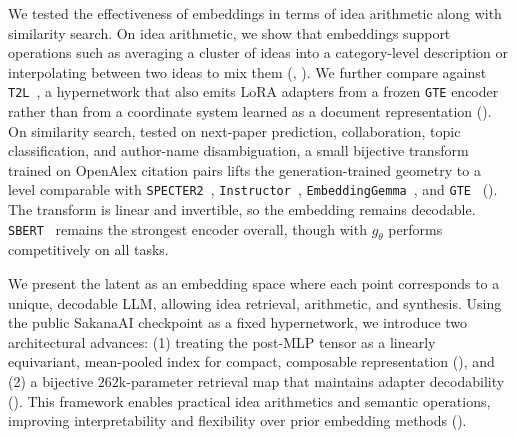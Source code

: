 We tested the effectiveness of \doctolora embeddings in terms of idea arithmetic along with similarity search.
On idea arithmetic, we show that \doctolora embeddings support operations such as averaging a cluster of ideas into a category-level description or interpolating between two ideas to mix them (, ).
We further compare against \texttt{T2L}~\citep{charakorn2025texttolora}, a hypernetwork that also emits LoRA adapters from a frozen \texttt{GTE} encoder~\citep{li2023gte} rather than from a coordinate system learned as a document representation ().
On similarity search, tested on next-paper prediction, collaboration, topic classification, and author-name disambiguation, a small bijective transform trained on OpenAlex citation pairs lifts the generation-trained geometry to a level comparable with \texttt{SPECTER2}~\citep{singh2023scirepeval}, \texttt{Instructor}~\citep{su2023instructor}, \texttt{EmbeddingGemma}~\citep{embeddinggemma2025}, and \texttt{GTE}~\citep{li2023gte} ().
The transform is linear and invertible, so the embedding remains decodable.
\texttt{SBERT}~\citep{reimers2019sbert} remains the strongest encoder overall, though \doctolora with $g_\theta$ performs competitively on all tasks.

We present the \doctolora latent as an embedding space where each point corresponds to a unique, decodable LLM, allowing idea retrieval, arithmetic, and synthesis. Using the public SakanaAI \doctolora checkpoint as a fixed hypernetwork, we introduce two architectural advances: (1) treating the post-MLP tensor as a linearly equivariant, mean-pooled index for compact, composable representation (), and (2) a bijective $262$k-parameter retrieval map that maintains adapter decodability (). This framework enables practical idea arithmetics and semantic operations, improving interpretability and flexibility over prior embedding methods ().

%

